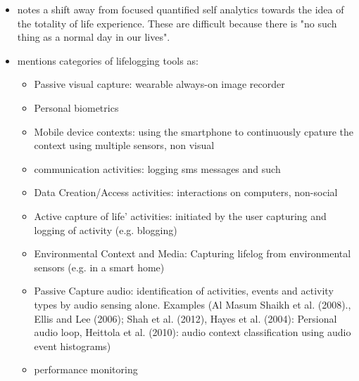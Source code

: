 \begin{itemize}
	\item \citet{gurrin2014lifelogging} notes a shift away from focused quantified self analytics towards the idea of the totality of life experience. These are difficult because there is "no such thing as a normal day in our lives".
	\item \citet{gurrin2014lifelogging} mentions categories of lifelogging tools as:
	\begin{itemize}
		\item Passive visual capture: wearable always-on image recorder
		\item Personal biometrics
		\item Mobile device contexts: using the smartphone to continuously cpature the context using multiple sensors, non visual
		\item communication activities: logging sms messages and such
		\item Data Creation/Access activities: interactions on computers, non-social
		\item Active capture of life' activities: initiated by the user capturing and logging of activity (e.g. blogging)
		\item Environmental Context and Media: Capturing lifelog from environmental sensors (e.g. in a smart home)
		\item Passive Capture audio: identification of activities, events and activity types by audio sensing alone. Examples (Al Masum Shaikh et al. (2008)., Ellis and Lee (2006); Shah et al.
		(2012), Hayes et al. (2004): Persional audio loop, Heittola et al. (2010): audio context classification using audio event histograms)
		\item performance monitoring
	\end{itemize}
\end{itemize}

